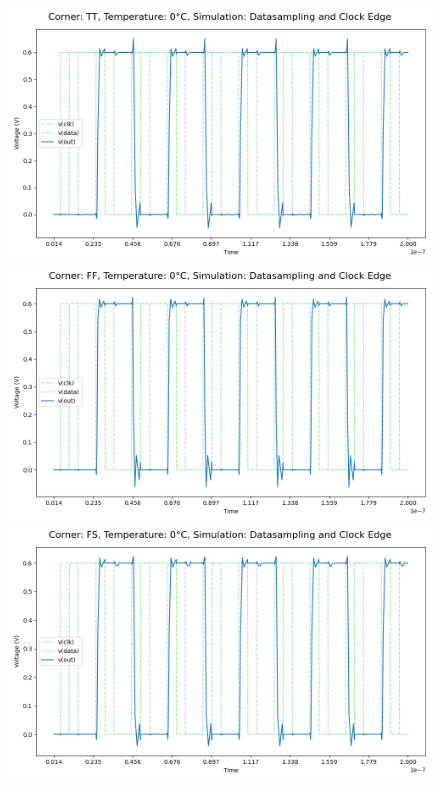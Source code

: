 \begin{figure}[H]
    \centering
    \includegraphics[height= 0.21\textheight]{figures/aimspice/TT/0/W1.csv.png}
    \vspace{5pt}
    \includegraphics[height= 0.21\textheight]{figures/aimspice/FF/0/W1.csv.png}
    \vspace{5pt}
    \includegraphics[height= 0.21\textheight]{figures/aimspice/FS/0/W1.csv.png}

\end{figure}

